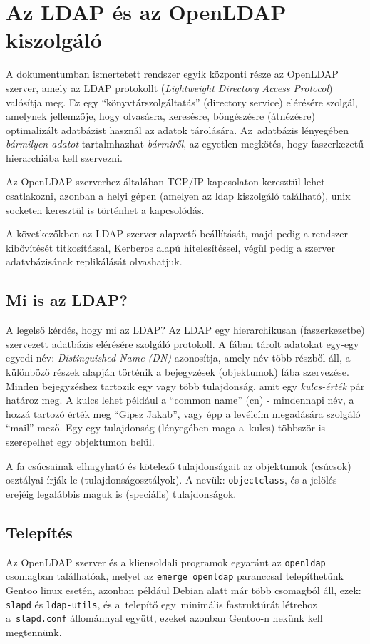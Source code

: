 \chapter{Az LDAP és az OpenLDAP kiszolgáló}

A dokumentumban ismertetett rendszer egyik központi része az OpenLDAP szerver, amely az LDAP protokollt ({\em Lightweight
  Directory Access Protocol}) valósítja meg. Ez egy ``könyvtárszolgáltatás''
(directory service) elérésére szolgál, amelynek jellemzője, hogy olvasásra, keresésre, böngészésre (átnézésre)
optimalizált adatbázist használ az adatok tárolására. Az~adatbázis lényegében \emph{bármilyen adatot} tartalmhazhat
\emph{bármiről}, az egyetlen megkötés, hogy faszerkezetű hierarchiába kell szervezni.

Az OpenLDAP szerverhez általában TCP/IP kapcsolaton keresztül lehet csatlakozni, azonban a helyi gépen (amelyen az
ldap kiszolgáló található), unix socketen keresztül is történhet a kapcsolódás.

A következőkben az LDAP szerver alapvető beállítását, majd pedig a rendszer kibővítését titkosítással,
Kerberos alapú hitelesítéssel, végül pedig a szerver adatvbázisának replikálását olvashatjuk.
\section{Mi is az LDAP?}

A legelső kérdés, hogy mi az LDAP?
Az LDAP egy hierarchikusan (faszerkezetbe) szervezett adatbázis elérésére szolgáló protokoll. A fában tárolt adatokat
egy-egy egyedi név: {\em Distinguished Name (DN)} azonosítja, amely név több részből áll, a  különböző részek alapján
történik a bejegyzések (objektumok) fába szervezése. Minden bejegyzéshez tartozik egy vagy több
tulajdonság, amit egy {\em kulcs-érték} pár határoz meg. A kulcs lehet például a ``common name'' (cn) - mindennapi
név, a hozzá tartozó érték meg ``Gipsz Jakab'', vagy épp a levélcím megadására szolgáló ``mail'' mező. Egy-egy
tulajdonság (lényegében maga a~kulcs) többször is szerepelhet egy objektumon belül.

A fa csúcsainak elhagyható és kötelező tulajdonságait az objektumok (csúcsok) osztályai írják le
(tulajdonságosztályok). A nevük: \texttt{objectclass}, és a jelölés erejéig legalábbis  maguk is (speciális)
tulajdonságok.


\section{Telepítés}
Az OpenLDAP szerver és a kliensoldali programok egyaránt az \texttt{openldap} csomagban találhatóak, melyet az
\texttt{emerge openldap} paranccsal telepíthetünk Gentoo linux esetén, azonban például Debian alatt már több csomagból
áll, ezek: \texttt{slapd} és \texttt{ldap-utils}, és a~telepítő egy~minimális fastruktúrát létrehoz a~\texttt{slapd.conf}
állománnyal együtt, ezeket azonban Gentoo-n nekünk kell megtennünk.

